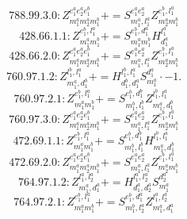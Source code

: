 \documentclass[letterpaper,10pt,fleqn,leqno,onecolumn]{article}
\begin{document}
\begin{equation} \;\;\;\;\;\;  788.99.3.0: Z^{e_{1}^{a}e_{2}^{a}e_{1}^{b}}_{m_{1}^{a}m_{2}^{a}m_{1}^{b}}+=S^{e_{1}^{a}e_{2}^{a}}_{m_{1}^{a},l_{1}^{a}}Z^{e_{1}^{b},l_{1}^{a}}_{m_{2}^{a}m_{1}^{b}} \end{equation}
\begin{equation} \;\;\;\;\;\;  428.66.1.1: Z^{e_{1}^{b},l_{1}^{a}}_{m_{1}^{a}m_{1}^{b}}+=S^{e_{1}^{b},d_{1}^{a}}_{m_{1}^{a}m_{1}^{b}}H^{l_{1}^{a}}_{d_{1}^{a}} \end{equation}
\begin{equation} \;\;\;\;\;\;  428.66.2.0: Z^{e_{1}^{a}e_{2}^{a}e_{1}^{b}}_{m_{1}^{a}m_{2}^{a}m_{1}^{b}}+=S^{e_{1}^{a}e_{2}^{a}}_{m_{1}^{a},l_{1}^{a}}Z^{e_{1}^{b},l_{1}^{a}}_{m_{2}^{a}m_{1}^{b}} \end{equation}
\begin{equation} \;\;\;\;\;\;  760.97.1.2: Z^{l_{1}^{b},l_{1}^{a}}_{m_{1}^{a},d_{1}^{b}}+=H^{l_{1}^{b},l_{1}^{a}}_{d_{1}^{b},d_{1}^{a}}S^{d_{1}^{a}}_{m_{1}^{a}}\cdot -1. \end{equation}
\begin{equation} \;\;\;\;\;\;  760.97.2.1: Z^{e_{1}^{b},l_{1}^{a}}_{m_{1}^{a}m_{1}^{b}}+=S^{e_{1}^{b},d_{1}^{b}}_{m_{1}^{b},l_{1}^{b}}Z^{l_{1}^{b},l_{1}^{a}}_{m_{1}^{a},d_{1}^{b}} \end{equation}
\begin{equation} \;\;\;\;\;\;  760.97.3.0: Z^{e_{1}^{a}e_{2}^{a}e_{1}^{b}}_{m_{1}^{a}m_{2}^{a}m_{1}^{b}}+=S^{e_{1}^{a}e_{2}^{a}}_{m_{1}^{a},l_{1}^{a}}Z^{e_{1}^{b},l_{1}^{a}}_{m_{2}^{a}m_{1}^{b}} \end{equation}
\begin{equation} \;\;\;\;\;\;  472.69.1.1: Z^{e_{1}^{b},l_{1}^{a}}_{m_{1}^{a}m_{1}^{b}}+=S^{e_{1}^{b},d_{1}^{b}}_{m_{1}^{b},l_{1}^{b}}H^{l_{1}^{b},l_{1}^{a}}_{m_{1}^{a},d_{1}^{b}} \end{equation}
\begin{equation} \;\;\;\;\;\;  472.69.2.0: Z^{e_{1}^{a}e_{2}^{a}e_{1}^{b}}_{m_{1}^{a}m_{2}^{a}m_{1}^{b}}+=S^{e_{1}^{a}e_{2}^{a}}_{m_{1}^{a},l_{1}^{a}}Z^{e_{1}^{b},l_{1}^{a}}_{m_{2}^{a}m_{1}^{b}} \end{equation}
\begin{equation} \;\;\;\;\;\;  764.97.1.2: Z^{l_{1}^{a},l_{2}^{a}}_{m_{1}^{a},d_{1}^{a}}+=H^{l_{1}^{a},l_{2}^{a}}_{d_{1}^{a},d_{2}^{a}}S^{d_{2}^{a}}_{m_{1}^{a}} \end{equation}
\begin{equation} \;\;\;\;\;\;  764.97.2.1: Z^{e_{1}^{b},l_{1}^{a}}_{m_{1}^{a}m_{1}^{b}}+=S^{e_{1}^{b},d_{1}^{a}}_{m_{1}^{b},l_{2}^{a}}Z^{l_{1}^{a},l_{2}^{a}}_{m_{1}^{a},d_{1}^{a}} \end{equation}
\end{document}
